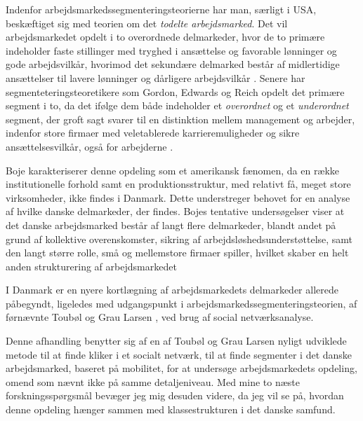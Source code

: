 
Indenfor arbejdsmarkedssegmenteringsteorierne har man, særligt i USA, beskæftiget sig med teorien om det \emph{todelte arbejdsmarked}. Det vil arbejdsmarkedet opdelt i to overordnede delmarkeder, hvor de to primære indeholder faste stillinger med tryghed i ansættelse og favorable lønninger og gode arbejdsvilkår, hvorimod det sekundære delmarked består af midlertidige ansættelser til lavere lønninger og dårligere arbejdsvilkår \parencite{Piore1980}. Senere har segmenteteringsteoretikere som Gordon, Edwards og Reich opdelt det primære segment i to, da det ifølge dem både indeholder et \emph{overordnet} og et \emph{underordnet} segment, der groft sagt svarer til en distinktion mellem  management og arbejder, indenfor store firmaer med veletablerede karrieremuligheder og sikre ansættelsesvilkår, også for arbejderne \parencite[202]{Gordon1982}. 

Boje karakteriserer denne opdeling som et amerikansk fænomen, da en række institutionelle forhold samt en produktionsstruktur, med relativt få, meget store virksomheder, ikke findes i Danmark. Dette understreger behovet for en analyse af hvilke danske delmarkeder, der findes. Bojes tentative undersøgelser viser at det danske arbejdsmarked består af langt flere delmarkeder, blandt andet på grund af kollektive overenskomster, sikring af arbejdsløshedsunderstøttelse, samt den langt større rolle, små og mellemstore firmaer spiller, hvilket skaber en helt anden strukturering af arbejdsmarkedet \parencite[36]{Boje1985}

I Danmark er en nyere kortlægning af arbejdsmarkedets delmarkeder allerede påbegyndt, ligeledes med udgangspunkt i arbejdsmarkedssegmenteringsteorien, af førnævnte Toubøl og Grau Larsen \citeyear {Touboel2013}, ved brug af social netværksanalyse. 

Denne afhandling benytter sig af en af Toubøl og Grau Larsen nyligt udviklede metode til at finde kliker i et socialt netværk, til at finde segmenter i det danske arbejdsmarked, baseret på mobilitet, for at undersøge arbejdsmarkedets opdeling, omend som nævnt ikke på samme detaljeniveau. Med mine to næste forskningsspørgsmål bevæger jeg mig desuden videre, da jeg vil se på, hvordan denne opdeling hænger sammen med klassestrukturen i det danske samfund.


